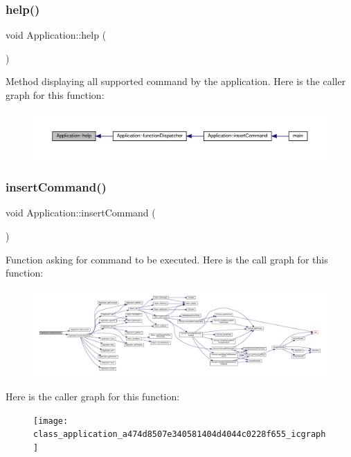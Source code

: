 \subsubsection{\texorpdfstring{help()}{help()}}
{\footnotesize\ttfamily void Application\+::help (\begin{DoxyParamCaption}{ }\end{DoxyParamCaption})\hspace{0.3cm}{\ttfamily [private]}}

Method displaying all supported command by the application. Here is the caller graph for this function\+:
\nopagebreak
\begin{figure}[H]
\begin{center}
\leavevmode
\includegraphics[width=350pt]{class_application_a2c6518d7f121299d9be8c66d31997fbc_icgraph}
\end{center}
\end{figure}
\mbox{\label{class_application_a474d8507e340581404d4044c0228f655}} 
\subsubsection{\texorpdfstring{insert\+Command()}{insertCommand()}}
{\footnotesize\ttfamily void Application\+::insert\+Command (\begin{DoxyParamCaption}{ }\end{DoxyParamCaption})}

Function asking for command to be executed. Here is the call graph for this function\+:
\nopagebreak
\begin{figure}[H]
\begin{center}
\leavevmode
\includegraphics[width=350pt]{class_application_a474d8507e340581404d4044c0228f655_cgraph}
\end{center}
\end{figure}
Here is the caller graph for this function\+:
\nopagebreak
\begin{figure}[H]
\begin{center}
\leavevmode
\texttt{[image: class\_application\_a474d8507e340581404d4044c0228f655\_icgraph]}
\end{center}
\end{figure}
\mbox{\label{class_application_ab2f161414a4e2f16e28321c192051006}} 
